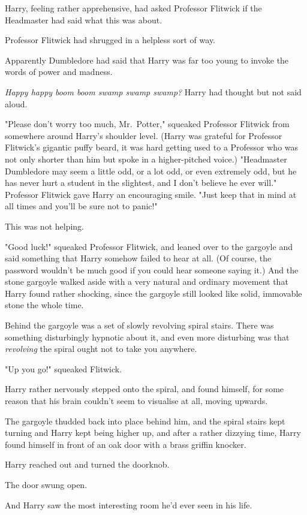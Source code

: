 Harry, feeling rather apprehensive, had asked Professor Flitwick if the
Headmaster had said what this was about.

Professor Flitwick had shrugged in a helpless sort of way.

Apparently Dumbledore had said that Harry was far too young to invoke the words
of power and madness.

\emph{Happy happy boom boom swamp swamp swamp?} Harry had thought but not said
aloud.

"Please don't worry too much, Mr.~Potter," squeaked Professor Flitwick from
somewhere around Harry's shoulder level. (Harry was grateful for Professor
Flitwick's gigantic puffy beard, it was hard getting used to a Professor who
was not only shorter than him but spoke in a higher-pitched voice.) "Headmaster
Dumbledore may seem a little odd, or a lot odd, or even extremely odd, but he
has never hurt a student in the slightest, and I don't believe he ever will."
Professor Flitwick gave Harry an encouraging smile. "Just keep that in mind at
all times and you'll be sure not to panic!"

This was not helping.

"Good luck!" squeaked Professor Flitwick, and leaned over to the gargoyle and
said something that Harry somehow failed to hear at all. (Of course, the
password wouldn't be much good if you could hear someone saying it.) And the
stone gargoyle walked aside with a very natural and ordinary movement that
Harry found rather shocking, since the gargoyle still looked like solid,
immovable stone the whole time.

Behind the gargoyle was a set of slowly revolving spiral stairs. There was
something disturbingly hypnotic about it, and even more disturbing was that
\emph{revolving} the spiral ought not to take you anywhere.

"Up you go!" squeaked Flitwick.

Harry rather nervously stepped onto the spiral, and found himself, for some
reason that his brain couldn't seem to visualise at all, moving upwards.

The gargoyle thudded back into place behind him, and the spiral stairs kept
turning and Harry kept being higher up, and after a rather dizzying time, Harry
found himself in front of an oak door with a brass griffin knocker.

Harry reached out and turned the doorknob.

The door swung open.

And Harry saw the most interesting room he'd ever seen in his life.

